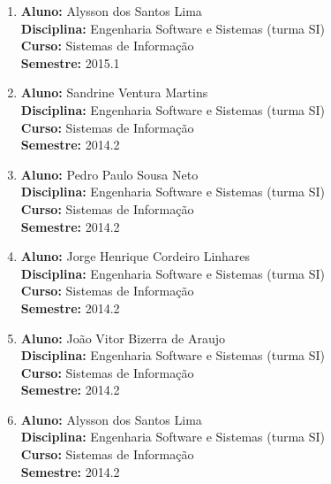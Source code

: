 \documentclass[a4paper,oneside,10pt]{article}
\begin{document}
\begin{enumerate}
\item   \textbf{Aluno:} Alysson dos Santos Lima \mbox{} \\
        \textbf{Disciplina:}  Engenharia Software e Sistemas (turma SI)\\
        \textbf{Curso:} Sistemas de Informação\\
        \textbf{Semestre:} 2015.1

\item   \textbf{Aluno:} Sandrine Ventura Martins \mbox{} \\
        \textbf{Disciplina:}  Engenharia Software e Sistemas (turma SI)\\
        \textbf{Curso:} Sistemas de Informação\\
        \textbf{Semestre:} 2014.2

\item   \textbf{Aluno:} Pedro Paulo Sousa Neto \mbox{} \\
        \textbf{Disciplina:}  Engenharia Software e Sistemas (turma SI)\\
        \textbf{Curso:} Sistemas de Informação\\
        \textbf{Semestre:} 2014.2

\item   \textbf{Aluno:} Jorge Henrique Cordeiro Linhares \mbox{} \\
        \textbf{Disciplina:}  Engenharia Software e Sistemas (turma SI)\\
        \textbf{Curso:} Sistemas de Informação\\
        \textbf{Semestre:} 2014.2

\item   \textbf{Aluno:} João Vitor Bizerra de Araujo \mbox{} \\
        \textbf{Disciplina:}  Engenharia Software e Sistemas (turma SI)\\
        \textbf{Curso:} Sistemas de Informação\\
        \textbf{Semestre:} 2014.2

\item   \textbf{Aluno:} Alysson dos Santos Lima \mbox{} \\
        \textbf{Disciplina:}  Engenharia Software e Sistemas (turma SI)\\
        \textbf{Curso:} Sistemas de Informação\\
        \textbf{Semestre:} 2014.2

\end{enumerate}
\end{document}
